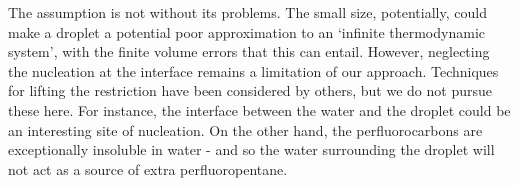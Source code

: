 The assumption is not without its problems.
The small size, potentially, could  make a droplet a potential poor approximation to an `infinite thermodynamic system',
with the finite volume errors that this can entail.
However, neglecting the nucleation at the interface remains a limitation of our approach.
Techniques for lifting the restriction have been considered by others\cite{Jarvis1975, Katz1992},
but we do not pursue these here.
For instance, the interface between the water and the droplet could be an interesting site of nucleation.
On the other hand, the perfluorocarbons are exceptionally insoluble in water -
and so the water surrounding the droplet will not act as a source of extra perfluoropentane.





